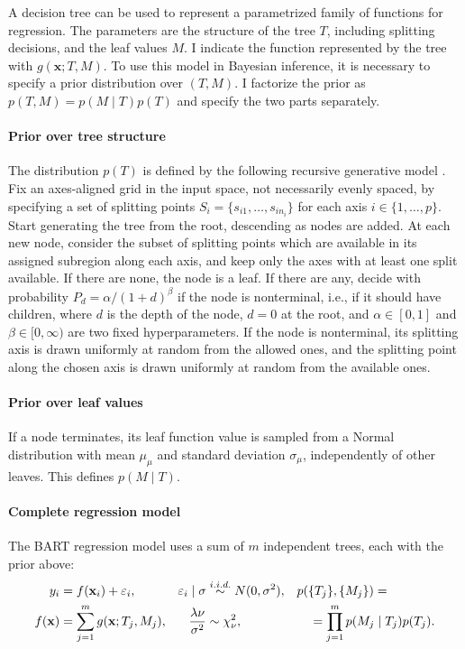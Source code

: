 \documentclass{article}
\begin{document}
    A decision tree can be used to represent a parametrized family of functions for regression. The parameters are the structure of the tree $T$, including splitting decisions, and the leaf values $M$. I indicate the function represented by the tree with $g(\mathbf x;T,M)$. To use this model in Bayesian inference, it is necessary to specify a prior distribution over $(T,M)$. I factorize the prior as $p(T,M) = p(M\mid T) p(T)$ and specify the two parts separately.

    \paragraph{Prior over tree structure}
    
    The distribution $p(T)$ is defined by the following recursive generative model \autocite[see][]{chipman1998}. Fix an axes-aligned grid in the input space, not necessarily evenly spaced, by specifying a set of splitting points $S_i = \{s_{i1}, \ldots, s_{in_i}\}$ for each axis $i \in \{1,\ldots,p\}$. Start generating the tree from the root, descending as nodes are added. At each new node, consider the subset of splitting points which are available in its assigned subregion along each axis, and keep only the axes with at least one split available. If there are none, the node is a leaf. If there are any, decide with probability $P_d = \alpha/(1 + d)^\beta$ if the node is nonterminal, i.e., if it should have children, where $d$ is the depth of the node, $d=0$ at the root, and $\alpha \in [0, 1]$ and $\beta \in [0,\infty)$ are two fixed hyperparameters. If the node is nonterminal, its splitting axis is drawn uniformly at random from the allowed ones, and the splitting point along the chosen axis is drawn uniformly at random from the available ones.

    \paragraph{Prior over leaf values}
    
    If a node terminates, its leaf function value is sampled from a Normal distribution with mean $\mu_\mu$ and standard deviation $\sigma_\mu$, independently of other leaves. This defines $p(M\mid T)$.

    \paragraph{Complete regression model}
    
    The BART regression model uses a sum of $m$ independent trees, each with the prior above:
    \begin{align}
        y_i &= f(\mathbf x_i) + \varepsilon_i, &
        \varepsilon_i \mid\sigma &\overset{i.i.d.}\sim \mathcal \mathcal N(0, \sigma^2), &
        &p(\{T_j\}, \{M_j\}) = \notag \\
        f(\mathbf x) &= \sum_{j=1}^m g(\mathbf x; T_j, M_j), &
        \frac{\lambda\nu}{\sigma^2} &\sim \chi^2_\nu, &
        &\quad = \prod_{j=1}^m p(M_j \mid T_j) p(T_j). \label{eq:bartdef}
    \end{align}
\end{document}
